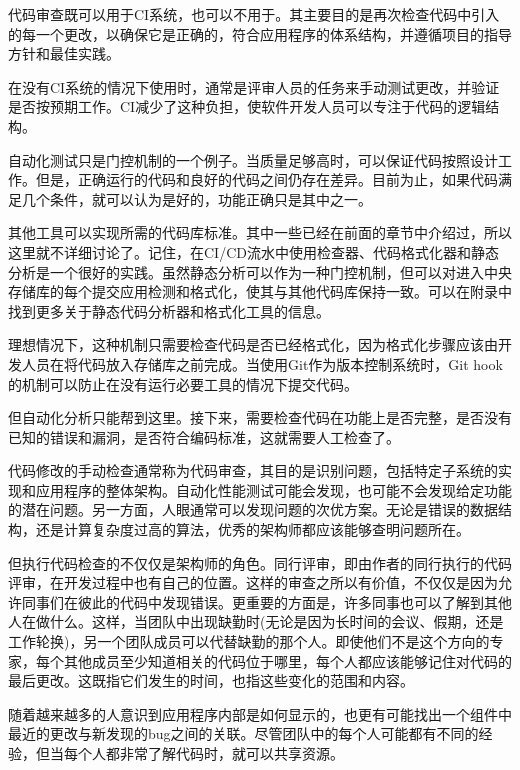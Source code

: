 
代码审查既可以用于CI系统，也可以不用于。其主要目的是再次检查代码中引入的每一个更改，以确保它是正确的，符合应用程序的体系结构，并遵循项目的指导方针和最佳实践。

在没有CI系统的情况下使用时，通常是评审人员的任务来手动测试更改，并验证是否按预期工作。CI减少了这种负担，使软件开发人员可以专注于代码的逻辑结构。


自动化测试只是门控机制的一个例子。当质量足够高时，可以保证代码按照设计工作。但是，正确运行的代码和良好的代码之间仍存在差异。目前为止，如果代码满足几个条件，就可以认为是好的，功能正确只是其中之一。

其他工具可以实现所需的代码库标准。其中一些已经在前面的章节中介绍过，所以这里就不详细讨论了。记住，在CI/CD流水中使用检查器、代码格式化器和静态分析是一个很好的实践。虽然静态分析可以作为一种门控机制，但可以对进入中央存储库的每个提交应用检测和格式化，使其与其他代码库保持一致。可以在附录中找到更多关于静态代码分析器和格式化工具的信息。

理想情况下，这种机制只需要检查代码是否已经格式化，因为格式化步骤应该由开发人员在将代码放入存储库之前完成。当使用Git作为版本控制系统时，Git hook的机制可以防止在没有运行必要工具的情况下提交代码。

但自动化分析只能帮到这里。接下来，需要检查代码在功能上是否完整，是否没有已知的错误和漏洞，是否符合编码标准，这就需要人工检查了。


代码修改的手动检查通常称为代码审查，其目的是识别问题，包括特定子系统的实现和应用程序的整体架构。自动化性能测试可能会发现，也可能不会发现给定功能的潜在问题。另一方面，人眼通常可以发现问题的次优方案。无论是错误的数据结构，还是计算复杂度过高的算法，优秀的架构师都应该能够查明问题所在。

但执行代码检查的不仅仅是架构师的角色。同行评审，即由作者的同行执行的代码评审，在开发过程中也有自己的位置。这样的审查之所以有价值，不仅仅是因为允许同事们在彼此的代码中发现错误。更重要的方面是，许多同事也可以了解到其他人在做什么。这样，当团队中出现缺勤时(无论是因为长时间的会议、假期，还是工作轮换)，另一个团队成员可以代替缺勤的那个人。即使他们不是这个方向的专家，每个其他成员至少知道相关的代码位于哪里，每个人都应该能够记住对代码的最后更改。这既指它们发生的时间，也指这些变化的范围和内容。

随着越来越多的人意识到应用程序内部是如何显示的，也更有可能找出一个组件中最近的更改与新发现的bug之间的关联。尽管团队中的每个人可能都有不同的经验，但当每个人都非常了解代码时，就可以共享资源。

